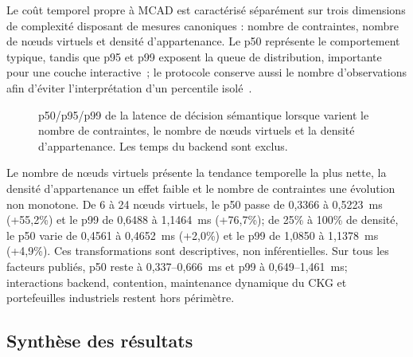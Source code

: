 \documentclass[journal]{IEEEtran}
\begin{document}
Le coût temporel propre à MCAD est caractérisé séparément sur trois dimensions de complexité disposant de mesures canoniques : nombre de contraintes, nombre de nœuds virtuels et densité d'appartenance. Le p50 représente le comportement typique, tandis que p95 et p99 exposent la queue de distribution, importante pour une couche interactive~\cite{DeanBarroso2013}; le protocole conserve aussi le nombre d'observations afin d'éviter l'interprétation d'un percentile isolé~\cite{KaliberaJones2013}.



\begin{figure}[!t]
\centering
\begin{minipage}[t]{0.32\textwidth}\centering\end{minipage}\hfill
\begin{minipage}[t]{0.32\textwidth}\centering\end{minipage}\hfill
\begin{minipage}[t]{0.32\textwidth}\centering\end{minipage}
\caption{p50/p95/p99 de la latence de décision sémantique lorsque varient le nombre de contraintes, le nombre de nœuds virtuels et la densité d'appartenance. Les temps du backend sont exclus.}
\label{fig:semantic-latency}
\end{figure}

Le nombre de nœuds virtuels présente la tendance temporelle la plus nette, la densité d'appartenance un effet faible et le nombre de contraintes une évolution non monotone. De 6 à 24 nœuds virtuels, le p50 passe de 0,3366 à 0,5223~ms (+55,2\%) et le p99 de 0,6488 à 1,1464~ms (+76,7\%); de 25\% à 100\% de densité, le p50 varie de 0,4561 à 0,4652~ms (+2,0\%) et le p99 de 1,0850 à 1,1378~ms (+4,9\%). Ces transformations sont descriptives, non inférentielles. Sur tous les facteurs publiés, p50 reste à 0,337--0,666~ms et p99 à 0,649--1,461~ms; interactions backend, contention, maintenance dynamique du CKG et portefeuilles industriels restent hors périmètre.

\subsection{Synthèse des résultats}
\end{document}
